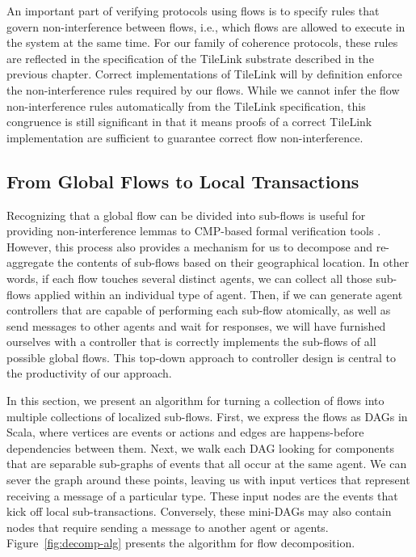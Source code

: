 An important part of verifying protocols using flows is to specify rules that govern non-interference between flows,
i.e., which flows are allowed to execute in the system at the same time.
For our family of coherence protocols, these rules are reflected in the specification of the TileLink substrate
described in the previous chapter.
Correct implementations of TileLink will by definition enforce the non-interference rules required by our flows.
While we cannot infer the flow non-interference rules automatically from the TileLink specification,
this congruence is still significant in that it means proofs of a correct TileLink implementation
are sufficient to guarantee correct flow non-interference.

\subsection{From Global Flows to Local Transactions}

Recognizing that a global flow can be divided into sub-flows is useful for providing non-interference lemmas to CMP-based formal verification tools \cite{oleary-fmcad09}.
However, this process also provides a mechanism for us to decompose and re-aggregate the contents of sub-flows based on their geographical location.
In other words, if each flow touches several distinct agents, 
we can collect all those sub-flows applied within an individual type of agent.
Then, if we can generate agent controllers that are capable of performing each sub-flow atomically,
as well as send messages to other agents and wait for responses,
we will have furnished ourselves with a controller that is correctly implements the sub-flows of all
possible global flows.
This top-down approach to controller design is central to the productivity of our approach.

In this section, we present an algorithm for turning a collection of flows into multiple collections of localized sub-flows.
First, we express the flows as DAGs in Scala, where vertices are events or actions and edges are happens-before dependencies between them.
Next, we walk each DAG looking for components that are separable sub-graphs of events that all occur at the same agent.
We can sever the graph around these points, leaving us with input vertices that represent receiving a message of a particular type.
These input nodes are the events that kick off local sub-transactions.
Conversely, these mini-DAGs may also contain nodes that require sending a message to another agent or agents.
Figure~\ref{fig:decomp-alg} presents the algorithm for flow decomposition.

